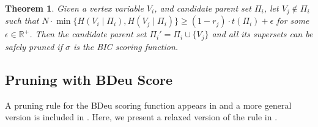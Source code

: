 \documentclass[letterpaper]{article}
\newtheorem{theorem}{Theorem}
\newtheorem{lemma}{Lemma}
\begin{document}



\begin{theorem}
Given a vertex variable $V_i$, and candidate parent set $\Pi_i$, let $V_j \notin \Pi_i$  such that $N \cdot \min \{H(V_i \mid \Pi_i), H(V_j \mid \Pi_i)\} \geq (1 - r_{j}) \cdot t(\Pi_i) +\epsilon$ for some $\epsilon \in \mathbb{R}^+$. Then the candidate parent set $\Pi_i' = \Pi_i \cup \{V_j \}$ and all its supersets can be safely pruned if $\sigma$ is the BIC scoring function.
\end{theorem}

\subsection{Pruning with BDeu Score}

A pruning rule for the BDeu scoring function appears in \cite{Campos2017} and a more general version is included in \cite{cussens2015gobnilp}. Here, we present a relaxed version of the rule in \cite{cussens2015gobnilp}.  

\end{document}
